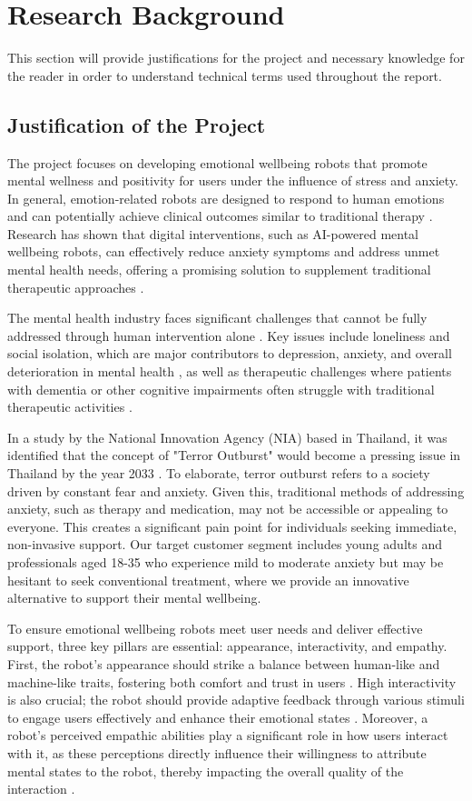 \section{Research Background}
This section will provide justifications for the project and necessary knowledge for the reader in order to understand technical terms used throughout the report.
\subsection{Justification of the Project}

The project focuses on developing emotional wellbeing robots that promote mental wellness and positivity for users under the influence of stress and anxiety. In general, emotion-related robots are designed to respond to human emotions and can potentially achieve clinical outcomes similar to traditional therapy \cite{palmer2024}. Research has shown that digital interventions, such as AI-powered mental wellbeing robots, can effectively reduce anxiety symptoms and address unmet mental health needs, offering a promising solution to supplement traditional therapeutic approaches \cite{mamatha2024}.

The mental health industry faces significant challenges that cannot be fully addressed through human intervention alone \cite{charles2024}. Key issues include loneliness and social isolation, which are major contributors to depression, anxiety, and overall deterioration in mental health \cite{goh2023}, as well as therapeutic challenges where patients with dementia or other cognitive impairments often struggle with traditional therapeutic activities \cite{sukhawathanakul2021}.

In a study by the National Innovation Agency (NIA) based in Thailand, it was identified that the concept of "Terror Outburst" would become a pressing issue in Thailand by the year 2033 \cite{nia2023}. To elaborate, terror outburst refers to a society driven by constant fear and anxiety. Given this, traditional methods of addressing anxiety, such as therapy and medication, may not be accessible or appealing to everyone. This creates a significant pain point for individuals seeking immediate, non-invasive support. Our target customer segment includes young adults and professionals aged 18-35 who experience mild to moderate anxiety but may be hesitant to seek conventional treatment, where we provide an innovative alternative to support their mental wellbeing.

To ensure emotional wellbeing robots meet user needs and deliver effective support, three key pillars are essential: appearance, interactivity, and empathy. First, the robot's appearance should strike a balance between human-like and machine-like traits, fostering both comfort and trust in users \cite{decet2024}. High interactivity is also crucial; the robot should provide adaptive feedback through various stimuli to engage users effectively and enhance their emotional states \cite{wang2024}. Moreover, a robot's perceived empathic abilities play a significant role in how users interact with it, as these perceptions directly influence their willingness to attribute mental states to the robot, thereby impacting the overall quality of the interaction \cite{lillo2024}.

